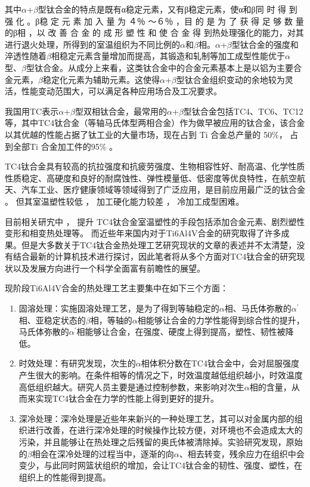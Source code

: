 \documentclass[
class = book,
zihao = -4,
font = noto,
paper = a4paper,
openany
]{easybook}
\newcommand{\ti}{Ti6Al4V}
\begin{document}
其中$\alpha $+$\beta $型钛合金的特点是既有α稳定元素，又有β稳定元素，使α和β同 时 得 到 强 化 。β稳 定 元 素 加 入 量 为 ４％ ～６％ ，目 的 是 为 了 获 得 足 够 数 量 的β相 ，以 改 善 合 金 的 成 形 塑 性 和 使 合 金 得 到热处理强化的能力，对其进行退火处理，所得到的室温组织为不同比例的$\alpha $和$\beta $相。$\alpha $+$\beta $型钛合金的强度和淬透性随着$\beta $相稳定元素含量增加而提高，其锻造和轧制等加工成型性能优于$\alpha $型、$\beta $型钛合金。从成分上来看，这类钛合金中的合金元素基本上是以铝为主要合金元素，$\beta $稳定化元素为辅助元素。这使得$\alpha $+$\beta $型钛合金组织变动的余地较为灵活，性能变动范围大，可以满足各种应用场合及工况要求\cite{TiandAl}。

我国用TC表示$\alpha $+$\beta $型双相钛合金，最常用的$\alpha $+$\beta $型钛合金包括TC4、TC6、TC12等，其中TC4钛合金（等轴马氏体型两相合金）作为做早被应用的钛合金，该合金以其优越的性能占据了钛工业的大量市场，现在占到 Ti 合金总产量的 50$ \%  $， 占到全部Ti 合金加工件的95$ \% $ 。

TC4钛合金具有较高的抗拉强度和抗疲劳强度、生物相容性好、耐高温、化学性质性质稳定、高硬度和良好的耐腐蚀性、弹性模量低、低密度等优良特性，在航空航天、汽车工业、医疗健康领域等领域得到了广泛应用，是目前应用最广泛的钛合金 。 但其室温塑性较低 ， 加工硬化能力较差 ， 冷加工成型困难。

 目前相关研宄中 ， 提升 TC4钛合金室温塑性的手段包括添加合金元素、剧烈塑性变形和相变热处理等。 而近些年来国内对于\ti 合金的研究取得了许多成果\cite{tc42021}。但是大多数关于TC4钛合金热处理工艺研究现状的文章的表述并不太清楚，没有结合最新的计算机技术进行探讨，因此笔者将从多个方面对TC4钛合金的研究现状以及发展方向进行一个科学全面富有前瞻性的展望。

现阶段\ti 合金的热处理工艺主要集中在如下三个方面：
\begin{enumerate}
	\item 固溶处理：实施固溶处理工艺，是为了得到等轴稳定的$\alpha $相、马氏体弥散的$ \alpha ^{'} $相、亚稳定状态的$\beta $相，等轴的$\alpha $相能够让合金的力学性能得到综合性的提升，马氏体弥散的$ \alpha ^{'} $相能够让合金，在强度、硬度上得到提高，塑性、韧性被降低\cite{gurong2002}。
	\item 时效处理：有研究\cite{timing}发现，次生的$\alpha $相体积分数在TC4钛合金中，会对屈服强度产生很大的影响。在条件相等的情况之下，时效温度越低组织越小，时效温度高低组织越大。研究人员主要是通过控制参数，来影响对次生$\alpha $相的含量，从而来实现TC4钛合金在力学的性能上得到更好的提升。
	\item 深冷处理：深冷处理是近些年来新兴的一种处理工艺，其可以对金属内部的组织进行改善，在进行深冷处理的时候操作比较方便，对环境也不会造成太大的污染，并且能够让在热处理之后残留的奥氏体被清除掉。实验研究发现，原始的$\beta $相会在深冷处理的过程当中，逐渐的向$\alpha $、相去转变，残余应力在组织中会变少，与此同时网篮状组织的增加，会让TC4钛合金的韧性、强度、塑性，在组织上的性能得到提高。
\end{enumerate}
\end{document}
